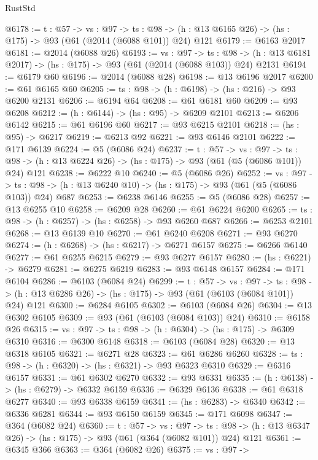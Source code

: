\begin{lexlean}{RustStd}
\begin{coremodule}
@6178 := {t : @57} ->
  {vs : @97} ->
  {ts : @98} -> (h : @13 @6165 @26) -> (hs : @175) -> @93 (@61 (@2014 (@6088 @101)) @24) @121
@6179 := @6163 @2017
@6181 := @2014 (@6088 @26)
@6193 := {vs : @97} ->
  {ts : @98} -> (h : @13 @6181 @2017) -> (hs : @175) -> @93 (@61 (@2014 (@6088 @103)) @24) @2131
@6194 := @6179 @60
@6196 := @2014 (@6088 @28)
@6198 := @13 @6196 @2017
@6200 := @61 @6165 @60
@6205 := {ts : @98} -> (h : @6198) -> (hs : @216) -> @93 @6200 @2131
@6206 := @6194 @64
@6208 := @61 @6181 @60
@6209 := @93 @6208
@6212 := (h : @6144) -> (hs : @95) -> @6209 @2101
@6213 := @6206 @6142
@6215 := @61 @6196 @60
@6217 := @93 @6215 @2101
@6218 := (hs : @95) -> @6217
@6219 := @6213 @92
@6221 := @93 @6146 @2101
@6222 := @171 @6139
@6224 := @5 (@6086 @24)
@6237 := {t : @57} ->
  {vs : @97} ->
  {ts : @98} -> (h : @13 @6224 @26) -> (hs : @175) -> @93 (@61 (@5 (@6086 @101)) @24) @121
@6238 := @6222 @10
@6240 := @5 (@6086 @26)
@6252 := {vs : @97} ->
  {ts : @98} -> (h : @13 @6240 @10) -> (hs : @175) -> @93 (@61 (@5 (@6086 @103)) @24) @687
@6253 := @6238 @6146
@6255 := @5 (@6086 @28)
@6257 := @13 @6255 @10
@6258 := @6209 @28
@6260 := @61 @6224 @6200
@6265 := {ts : @98} -> (h : @6257) -> (hs : @6258) -> @93 @6260 @687
@6266 := @6253 @2101
@6268 := @13 @6139 @10
@6270 := @61 @6240 @6208
@6271 := @93 @6270
@6274 := (h : @6268) -> (hs : @6217) -> @6271 @6157
@6275 := @6266 @6140
@6277 := @61 @6255 @6215
@6279 := @93 @6277 @6157
@6280 := (hs : @6221) -> @6279
@6281 := @6275 @6219
@6283 := @93 @6148 @6157
@6284 := @171 @6104
@6286 := @6103 (@6084 @24)
@6299 := {t : @57} ->
  {vs : @97} ->
  {ts : @98} -> (h : @13 @6286 @26) -> (hs : @175) -> @93 (@61 (@6103 (@6084 @101)) @24) @121
@6300 := @6284 @6105
@6302 := @6103 (@6084 @26)
@6304 := @13 @6302 @6105
@6309 := @93 (@61 (@6103 (@6084 @103)) @24)
@6310 := @6158 @26
@6315 := {vs : @97} -> {ts : @98} -> (h : @6304) -> (hs : @175) -> @6309 @6310
@6316 := @6300 @6148
@6318 := @6103 (@6084 @28)
@6320 := @13 @6318 @6105
@6321 := @6271 @28
@6323 := @61 @6286 @6260
@6328 := {ts : @98} -> (h : @6320) -> (hs : @6321) -> @93 @6323 @6310
@6329 := @6316 @6157
@6331 := @61 @6302 @6270
@6332 := @93 @6331
@6335 := (h : @6138) -> (hs : @6279) -> @6332 @6159
@6336 := @6329 @6136
@6338 := @61 @6318 @6277
@6340 := @93 @6338 @6159
@6341 := (hs : @6283) -> @6340
@6342 := @6336 @6281
@6344 := @93 @6150 @6159
@6345 := @171 @6098
@6347 := @364 (@6082 @24)
@6360 := {t : @57} ->
  {vs : @97} ->
  {ts : @98} -> (h : @13 @6347 @26) -> (hs : @175) -> @93 (@61 (@364 (@6082 @101)) @24) @121
@6361 := @6345 @366
@6363 := @364 (@6082 @26)
@6375 := {vs : @97} ->

\end{coremodule}
\end{lexlean}
